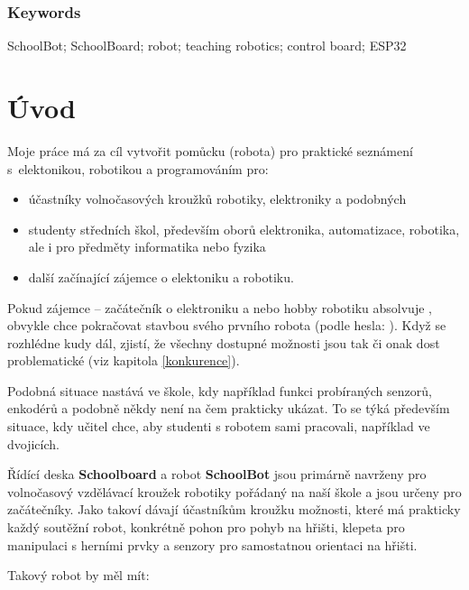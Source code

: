 \documentclass{template/socthesis}
\begin{document}
\subsection*{Keywords}
SchoolBot; SchoolBoard; robot; teaching robotics; control board; ESP32

\newpage
\pagestyle{plain}

\tableofcontents %

\setcounter{figure}{0}
\setcounter{table}{0}
\newpage

\chapter*{Úvod}
Moje práce má za cíl vytvořit pomůcku (robota) pro praktické seznámení s~elektonikou, robotikou a programováním pro:  

\begin{itemize}
	\item účastníky volnočasových kroužků robotiky, elektroniky a podobných
	\item studenty středních škol, především oborů elektronika, automatizace, robotika, ale i pro předměty informatika nebo fyzika
	\item další začínající zájemce o elektoniku a robotiku. 
\end{itemize}


 Pokud zájemce -- začátečník  o elektroniku a nebo hobby robotiku absolvuje , obvykle chce pokračovat stavbou svého prvního robota (podle hesla: ). Když se 
 rozhlédne kudy dál, zjistí, že všechny dostupné možnosti jsou tak či onak dost problematické (viz kapitola \ref{konkurence}). 
 
 Podobná situace nastává ve škole, kdy například funkci probíraných senzorů, enkodérů a podobně někdy není na čem prakticky ukázat. To se týká především situace, kdy učitel chce, aby studenti s robotem sami pracovali, například ve dvojicích.   

Řídící deska \textbf{Schoolboard} a robot \textbf{SchoolBot} jsou primárně navrženy pro volnočasový vzdělávací kroužek robotiky pořádaný na naší škole a jsou určeny pro začátečníky. Jako takoví dávají účastníkům kroužku možnosti, které má prakticky každý soutěžní robot, konkrétně pohon pro pohyb na hřišti, klepeta pro manipulaci s herními prvky a senzory pro samostatnou orientaci na hřišti. 
\newpage

 Takový robot by měl mít: 
\end{document}
